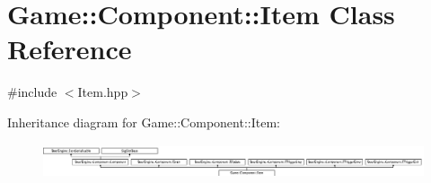 \hypertarget{class_game_1_1_component_1_1_item}{}\section{Game\+:\+:Component\+:\+:Item Class Reference}
\label{class_game_1_1_component_1_1_item}


{\ttfamily \#include $<$Item.\+hpp$>$}

Inheritance diagram for Game\+:\+:Component\+:\+:Item\+:\begin{figure}[H]
\begin{center}
\leavevmode
\includegraphics[height=1.021277cm]{class_game_1_1_component_1_1_item}
\end{center}
\end{figure}
